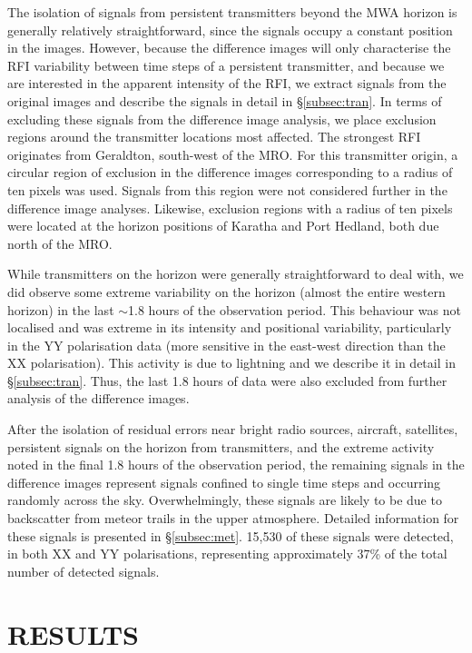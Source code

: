 The isolation of signals from persistent transmitters beyond the MWA horizon is generally relatively straightforward, since the signals occupy a constant position in the images.  However, because the difference images will only characterise the RFI variability between time steps of a persistent transmitter, and because we are interested in the apparent intensity of the RFI, we extract signals from the original images and describe the signals in detail in \S \ref{subsec:tran}.  In terms of excluding these signals from the difference image analysis, we place exclusion regions around the transmitter locations most affected.  The strongest RFI originates from Geraldton, south-west of the MRO.  For this transmitter origin, a circular region of exclusion in the difference images corresponding to a radius of ten pixels was used.  Signals from this region were not considered further in the difference image analyses.  Likewise, exclusion regions with a radius of ten pixels were located at the horizon positions of Karatha and Port Hedland, both due north of the MRO.

While transmitters on the horizon were generally straightforward to deal with, we did observe some extreme variability on the horizon (almost the entire western horizon) in the last $\sim$1.8 hours of the observation period.  This behaviour was not localised and was extreme in its intensity and positional variability, particularly in the YY polarisation data (more sensitive in the east-west direction than the XX polarisation).  This activity is due to lightning and we describe it in detail in \S \ref{subsec:tran}.  Thus, the last 1.8 hours of data were also excluded from further analysis of the difference images.

After the isolation of residual errors near bright radio sources, aircraft, satellites, persistent signals on the horizon from transmitters, and the extreme activity noted in the final 1.8 hours of the observation period, the remaining signals in the difference images represent signals confined to single time steps and occurring randomly across the sky.  Overwhelmingly, these signals are likely to be due to backscatter from meteor trails in the upper atmosphere.  Detailed information for these signals is presented in \S \ref{subsec:met}.  15,530 of these signals were detected, in both XX and YY polarisations, representing approximately 37\% of the total number of detected signals.

\section{RESULTS}
\label{sec:res}

